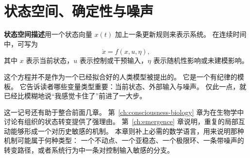 \section{状态空间、确定性与噪声}

\begin{definition}[状态空间描述]
\textbf{状态空间描述}用一个状态向量 $x(t)$ 加上一条更新规则来表示系统。
在连续时间中，可写为
\[
  \dot{x} = f(x,u,\eta),
\]
其中 $x$ 表示当前状态，$u$ 表示控制或干预输入，$\eta$ 表示随机性影响或未建模影响。
\end{definition}

\begin{remark}
这个方程并不是作为一个已经拟合好的人类模型被提出的。
它是一个有纪律的模板。
它告诉读者哪些变量类型重要：当前状态、外部输入与噪声。
仅此一点，就已经比模糊地说“我感觉卡住了”前进了一大步。
\end{remark}

这一记号还有助于整合前面几章。
第~\ref{ch:consciousness-biology} 章为在生物学中讨论有组织的状态转变提供了强理由。
第~\ref{ch:emergence} 章说明，重复的局部互动能够形成一个对历史敏感的机制。
本章则补上必需的数学语言，用来说明那种机制可能属于何种类型：
一个不动点、一个亚稳态、一个极限环、一条带噪声的转变路径，或者系统行为中一条对控制输入敏感的分支。